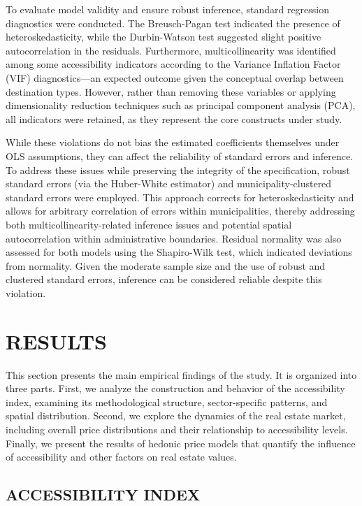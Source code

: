 \documentclass[
  12pt,
]{report}
\begin{document}
To evaluate model validity and ensure robust inference, standard
regression diagnostics were conducted. The Breusch-Pagan test indicated
the presence of heteroskedasticity, while the Durbin-Watson test
suggested slight positive autocorrelation in the residuals. Furthermore,
multicollinearity was identified among some accessibility indicators
according to the Variance Inflation Factor (VIF) diagnostics---an
expected outcome given the conceptual overlap between destination types.
However, rather than removing these variables or applying dimensionality
reduction techniques such as principal component analysis (PCA), all
indicators were retained, as they represent the core constructs under
study.

While these violations do not bias the estimated coefficients themselves
under OLS assumptions, they can affect the reliability of standard
errors and inference. To address these issues while preserving the
integrity of the specification, robust standard errors (via the
Huber-White estimator) and municipality-clustered standard errors were
employed. This approach corrects for heteroskedasticity and allows for
arbitrary correlation of errors within municipalities, thereby
addressing both multicollinearity-related inference issues and potential
spatial autocorrelation within administrative boundaries. Residual
normality was also assessed for both models using the Shapiro-Wilk test,
which indicated deviations from normality. Given the moderate sample
size and the use of robust and clustered standard errors, inference can
be considered reliable despite this violation.

\newpage

\chapter{RESULTS}\label{results}

This section presents the main empirical findings of the study. It is
organized into three parts. First, we analyze the construction and
behavior of the accessibility index, examining its methodological
structure, sector-specific patterns, and spatial distribution. Second,
we explore the dynamics of the real estate market, including overall
price distributions and their relationship to accessibility levels.
Finally, we present the results of hedonic price models that quantify
the influence of accessibility and other factors on real estate values.

\section{ACCESSIBILITY INDEX}\label{accessibility-index-1}
\end{document}
